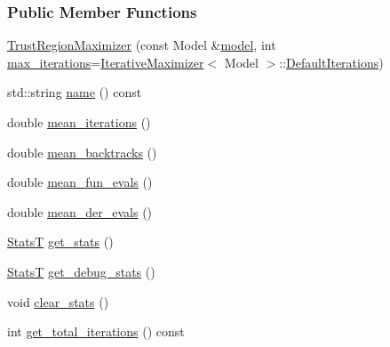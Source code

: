 \subsubsection*{Public Member Functions}
\begin{DoxyCompactItemize}
\item 
\hyperlink{classmappel_1_1estimator_1_1TrustRegionMaximizer_abae934095a3503dc86f67d82fc41f75e}{Trust\+Region\+Maximizer} (const Model \&\hyperlink{classmappel_1_1estimator_1_1Estimator_a2f157410771fb79a20d4d54e505750d0}{model}, int \hyperlink{classmappel_1_1estimator_1_1IterativeMaximizer_abf5fe0b08cfbcc403c3d01511726aa38}{max\+\_\+iterations}=\hyperlink{classmappel_1_1estimator_1_1IterativeMaximizer}{Iterative\+Maximizer}$<$ Model $>$\+::\hyperlink{classmappel_1_1estimator_1_1IterativeMaximizer_ab66c01c2eee630f3fca119f3fe09a19a}{Default\+Iterations})
\item 
std\+::string \hyperlink{classmappel_1_1estimator_1_1TrustRegionMaximizer_a61a03257e5c551bb3aacc4e67f24999c}{name} () const 
\item 
double \hyperlink{classmappel_1_1estimator_1_1IterativeMaximizer_a70504eeacb590296d249a51970736d3a}{mean\+\_\+iterations} ()
\item 
double \hyperlink{classmappel_1_1estimator_1_1IterativeMaximizer_a26cc129f7253798b7484a25ac59dfa71}{mean\+\_\+backtracks} ()
\item 
double \hyperlink{classmappel_1_1estimator_1_1IterativeMaximizer_ad6a2fc4797c19c411fde894669f1edba}{mean\+\_\+fun\+\_\+evals} ()
\item 
double \hyperlink{classmappel_1_1estimator_1_1IterativeMaximizer_a0fbb35e6f015bf1e1c5b1ee89f08cbad}{mean\+\_\+der\+\_\+evals} ()
\item 
\hyperlink{namespacemappel_a04ab395b0cf82c4ce68a36b2212649a5}{StatsT} \hyperlink{classmappel_1_1estimator_1_1IterativeMaximizer_a8a274f11cad09057aa2b0bc69f291c22}{get\+\_\+stats} ()
\item 
\hyperlink{namespacemappel_a04ab395b0cf82c4ce68a36b2212649a5}{StatsT} \hyperlink{classmappel_1_1estimator_1_1IterativeMaximizer_aa8f8cb9c66b559badee924617ec690b6}{get\+\_\+debug\+\_\+stats} ()
\item 
void \hyperlink{classmappel_1_1estimator_1_1IterativeMaximizer_a9c41aae7db286746e72e3d0ff8af1d13}{clear\+\_\+stats} ()
\item 
int \hyperlink{classmappel_1_1estimator_1_1IterativeMaximizer_a8c639ea1bf84e4531364906c933584af}{get\+\_\+total\+\_\+iterations} () const 
\item 

\end{DoxyCompactItemize}
